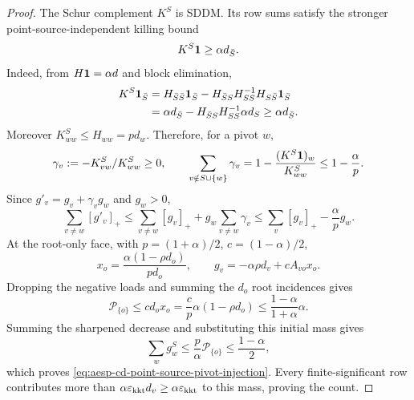 \begin{proof}
The Schur complement \(K^S\) is SDDM.  Its row sums satisfy the stronger
point-source-independent killing bound
\begin{equation*}
 K^S\mathbf{1}\geq\alpha d_{\bar S}.
\end{equation*}
Indeed, from \(H\mathbf{1}=\alpha d\) and block elimination,
\begin{align*}
 K^S\mathbf{1}_{\bar S}
 &=H_{\bar S\bar S}\mathbf{1}_{\bar S}
   -H_{\bar SS}H_{SS}^{-1}H_{S\bar S}\mathbf{1}_{\bar S}\\
 &=\alpha d_{\bar S}
   -H_{\bar SS}H_{SS}^{-1}\alpha d_S
 \geq\alpha d_{\bar S}.
\end{align*}
Moreover \(K^S_{ww}\leq H_{ww}=p d_w\).  Therefore, for a pivot \(w\),
\begin{equation*}
 \gamma_v:=-K^S_{vw}/K^S_{ww}\geq0,
 \qquad
 \sum_{v\notin S\cup\{w\}}\gamma_v
 =1-\frac{(K^S\mathbf{1})_w}{K^S_{ww}}
 \leq1-\frac{\alpha}{p}.
\end{equation*}
Since \(g'_v=g_v+\gamma_vg_w\) and \(g_w>0\),
\begin{equation*}
 \sum_{v\ne w}[g'_v]_+
 \leq\sum_{v\ne w}[g_v]_++g_w\sum_{v\ne w}\gamma_v
 \leq\sum_v[g_v]_+-\frac{\alpha}{p}g_w.
\end{equation*}
At the root-only face, with
\(p=(1+\alpha)/2\), \(c=(1-\alpha)/2\),
\begin{equation*}
 x_o=\frac{\alpha(1-\rho d_o)}{p d_o},
 \qquad
 g_v=-\alpha\rho d_v+cA_{vo}x_o.
\end{equation*}
Dropping the negative loads and summing the \(d_o\) root incidences gives
\begin{equation*}
 \mathcal P_{\{o\}}
 \leq c d_ox_o
 =\frac{c}{p}\alpha(1-\rho d_o)
 \leq\frac{1-\alpha}{1+\alpha}\alpha.
\end{equation*}
Summing the sharpened decrease and substituting this initial mass gives
\begin{equation*}
 \sum_w g^S_w
 \leq\frac{p}{\alpha}\mathcal P_{\{o\}}
 \leq\frac{1-\alpha}{2},
\end{equation*}
which proves \cref{eq:aesp-cd-point-source-pivot-injection}.
Every finite-significant row contributes more than
\(\alpha\varepsilon_{\mathrm{kkt}} d_v\geq\alpha\varepsilon_{\mathrm{kkt}}\) to this mass, proving the count.
\end{proof}

